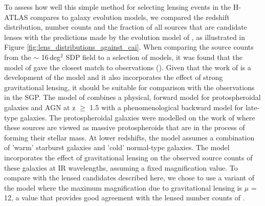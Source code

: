 To assess how well this simple method for selecting lensing events in the H-ATLAS compares to galaxy evolution models, we compared the redshift distribution, number counts and the fraction of all sources that are candidate lenses with the predictions made by the evolution model of \citealt{Cai_2013}, as illustrated in Figure \ref{fig:lens_distributions_against_cai}. When comparing the source counts from the $\sim$ 16\,deg$^{2}$ SDP field to a selection of models, it was found that the model of \citealt{Negrello_2007} gave the closest match to observations (\citealt{Clements_2010}). Given that the work of \citealt{Cai_2013} is a development of the \citealt{Negrello_2007} model and it also incorporates the effect of strong gravitational lensing, it should be suitable for comparison with the observations in the SGP. The model of \citealt{Cai_2013} combines a physical, forward model for protospheroidal galaxies and AGN at z $\geq$ 1.5 with a phenomenological backward model for late-type galaxies. The protospheroidal galaxies were modelled on the work of \citealt{Granato_2004} where these sources are viewed as massive protospheroids that are in the process of forming their stellar mass. At lower redshifts, the model assumes a combination of 'warm' starburst galaxies and 'cold' normal-type galaxies. The model incorporates the effect of gravitational lensing on the observed source counts of these galaxies at IR wavelengths, assuming a fixed magnification value. To compare with the lensed candidates described here, we chose to use a variant of the \citealt{Cai_2013} model where the maximum magnification due to gravitational lensing is $\mu$ = 12, a value that provides good agreement with the lensed number counts of \citealt{Negrello_2017}.

